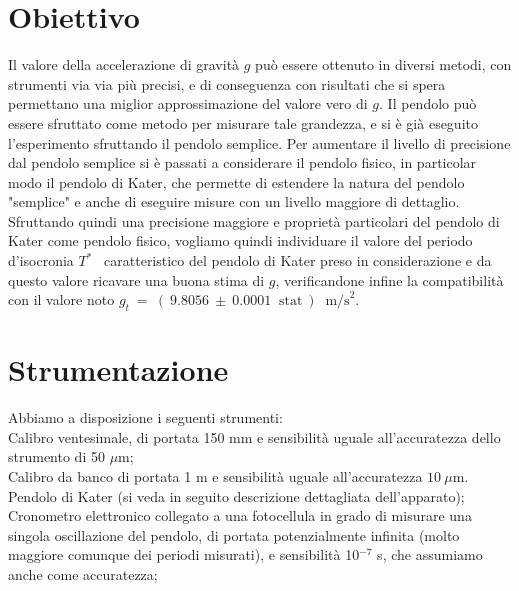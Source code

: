 \documentclass[italian, a4paper, 10pt, twocolumn]{../../style/lab_unige}
\newcommand{\gLab}{$g_t~=~(~9.8056~\pm~0.0001~\text{ stat}~)~\text{ m/s}^2$}
\newcommand{\Tiso}{$T^*$}
\begin{document}

    \section{Obiettivo}
    \label{section:aim}
    Il valore della accelerazione di gravità $g$ può essere ottenuto in diversi metodi, con strumenti via via più precisi, e di conseguenza con risultati che si spera permettano una miglior approssimazione del valore vero di $g$. Il pendolo può essere sfruttato come metodo per misurare tale grandezza, e si è già eseguito l'esperimento sfruttando il pendolo semplice. Per aumentare il livello di precisione dal pendolo semplice si è passati a considerare il pendolo fisico, in particolar modo il pendolo di Kater, che permette di estendere la natura del pendolo "semplice" e anche di eseguire misure con un livello maggiore di dettaglio.\\
    Sfruttando quindi una precisione maggiore e proprietà particolari del pendolo di Kater come pendolo fisico, vogliamo quindi individuare il valore del periodo d'isocronia \Tiso~ caratteristico del pendolo di Kater preso in considerazione e da questo valore ricavare una buona stima di $g$, verificandone infine la compatibilità con il valore noto \gLab.

    \section{Strumentazione}
    \label{section:strument}
    Abbiamo a disposizione i seguenti strumenti:\\
    Calibro ventesimale, di portata 150 mm e sensibilità uguale all'accuratezza dello strumento di 50 $\mu$m;\\
    Calibro da banco di portata 1 m e sensibilità uguale all'accuratezza $10~\mu$m.\\
    Pendolo di Kater (si veda in seguito descrizione dettagliata dell'apparato);\\
    Cronometro elettronico collegato a una fotocellula in grado di misurare una singola oscillazione del pendolo, di portata potenzialmente infinita (molto maggiore comunque dei periodi misurati), e sensibilità 10$^{-7}$ s, che assumiamo anche come accuratezza;\\
\end{document}
